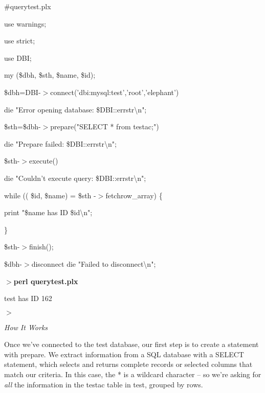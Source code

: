 \documentclass[a4paper,11pt]{book}
\begin{document}
\noindent \#querytest.plx

\noindent 

\noindent use warnings;

\noindent use strict;

\noindent use DBI;

\noindent 

\noindent my (\$dbh, \$sth, \$name, \$id);

\noindent 

\noindent \$dbh=DBI-$>$connect('dbi:mysql:test','root','elephant') \textbar \textbar 

\noindent die "Error opening database: \$DBI::errstr\textbackslash n";

\noindent 

\noindent \$sth=\$dbh-$>$prepare("SELECT * from testac;") \textbar \textbar 

\noindent die "Prepare failed: \$DBI::errstr\textbackslash n";

\noindent 

\noindent 

\noindent \$sth-$>$execute() \textbar \textbar 

\noindent die "Couldn't execute query: \$DBI::errstr\textbackslash n";

\noindent 

\noindent while (( \$id, \$name) = \$sth -$>$fetchrow\_array) \{

\noindent print "\$name has ID \$id\textbackslash n";

\noindent \}

\noindent 

\noindent \$sth-$>$finish();

\noindent 

\noindent \$dbh-$>$disconnect \textbar \textbar  die "Failed to disconnect\textbackslash n";

\noindent 

\noindent $>$\textbf{perl querytest.plx}

\noindent test has ID 162

\noindent $>$

\noindent 

\noindent \textit{How It Works}

\noindent Once we've connected to the test database, our first step is to create a statement with prepare. We extract information from a SQL database with a SELECT statement, which selects and returns complete records or selected columns that match our criteria. In this case, the * is a wildcard character -- so we're asking for \textit{all }the information in the testac table in test, grouped by rows.
\end{document}
